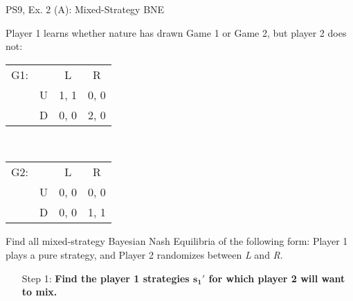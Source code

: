 \begin{frame}{PS9, Ex. 2 (A): Mixed-Strategy BNE}
    \begin{multicols}{2}
      Player 1 learns whether nature has drawn Game 1 or Game 2, but player 2 does not:
      \begin{table}
        \begin{tabular}{ll|c|c|}
          \multicolumn{1}{c}{G1:} & \multicolumn{1}{c}{} & \multicolumn{1}{c}{L} & \multicolumn{1}{c}{R} \\\cline{3-4}
          & U & 1, 1 & 0, 0 \\\cline{3-4}
          & D & 0, 0 & 2, 0 \\\cline{3-4}
        \end{tabular}\\\bigskip
        \begin{tabular}{ll|c|c|}
          \multicolumn{1}{c}{G2:} & \multicolumn{1}{c}{} & \multicolumn{1}{c}{L} & \multicolumn{1}{c}{R} \\\cline{3-4}
          & U & 0, 0 & 0, 0 \\\cline{3-4}
          & D & 0, 0 & 1, 1 \\\cline{3-4}
        \end{tabular}
      \end{table}
      Find all mixed-strategy Bayesian Nash Equilibria of the following form: Player 1 plays a pure strategy, and Player 2 randomizes between \textit{L} and \textit{R}.
      \begin{itemize}
        \item[Step 1:] \textbf{Find the player 1 strategies $\bm{s_1'}$ for which player 2 will want to mix.}
      \end{itemize}
      \vfill\null\columnbreak
      \vfill\null
    \end{multicols}
\end{frame}
